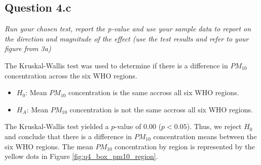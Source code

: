 \subsection{Question 4.c}
\textit{Run your chosen test, report the p-value and use your sample data to report
on the direction and magnitude of the effect (use the test results and refer to
your figure from 3a) }

\noindent The Kruskal-Wallis test was used to determine if there is a difference in $PM_{10}$ concentration across the six WHO regions. 


\begin{itemize}
    \item $H_0$: Mean $PM_{10}$ concentration is the same accross all six WHO regions.
    \item $H_A$: Mean $PM_{10}$ concentration is not the same accross all six WHO regions.
\end{itemize}

\noindent The Kruskal-Wallis test yielded a $p$-value of 0.00 ($p < 0.05$). Thus, we reject $H_0$ and conclude that there is a difference in $PM_{10}$ concentration means between the six WHO regions. The mean $PM_{10}$ concentration by region is represented by the yellow dots in Figure \ref{fig:q4_box_pm10_region}. 

   



\newpage